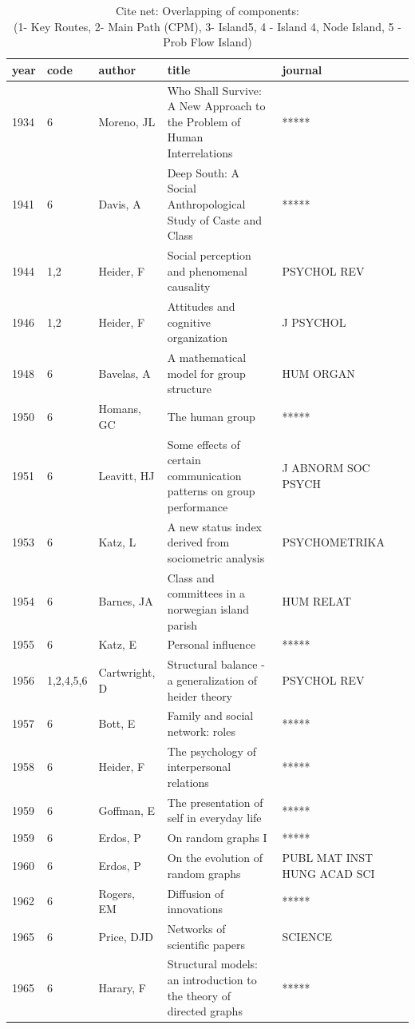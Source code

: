 \documentclass[11pt]{article} %
\begin{document}
\begin{longtable}{p{0.8cm}|p{1.25cm}|p{2.8cm}|p{7.5cm}|p{3cm}l}
\caption{Cite net: \label{compareA} Overlapping of components: \\
(1- Key Routes, 2- Main Path (CPM), 3- Island5, 4 - Island 4, Node Island, 5 - Prob Flow Island)} \\
\small
\renewcommand{\arraystretch}{0.7}
year&	code&	author&	title&	journal\\ \hline \endhead
1934&	6&	Moreno, JL&	 Who Shall Survive: A New Approach to the Problem of Human Interrelations&*****\\
1941&	6&	Davis, A &	 Deep South: A Social Anthropological Study of Caste and Class&*****\\
1944&	1,2&	Heider, F&	 Social perception and phenomenal causality&	PSYCHOL REV\\
1946&	1,2&	Heider, F&	 Attitudes and cognitive organization&	J PSYCHOL\\
1948&	6&	Bavelas, A&	 A mathematical model for group structure&	HUM ORGAN\\
1950&	6&	Homans, GC&	 The human group&	*****\\
1951&	6&	Leavitt, HJ&	 Some effects of certain communication patterns on group performance&	J ABNORM SOC PSYCH\\
1953&	6&	Katz, L&	 A new status index derived from sociometric analysis&	PSYCHOMETRIKA\\
1954&	6&	Barnes, JA&	 Class and committees in a norwegian island parish&	HUM RELAT\\
1955&	6&	Katz, E&	 Personal influence&	*****\\
1956&	1,2,4,5,6&	Cartwright, D&	 Structural balance - a generalization of heider theory&	PSYCHOL REV\\
1957&	6&	Bott, E&	 Family and social network: roles&	*****\\
1958&	6&	Heider, F&	 The psychology of interpersonal relations&	*****\\
1959&	6&	Goffman, E&	 The presentation of self in everyday life&	*****\\
1959&	6&	Erdos, P&	 On random graphs I&	*****\\
1960&	6&	Erdos, P&	On the evolution of random graphs&	PUBL MAT INST HUNG ACAD SCI\\
1962&	6&	Rogers, EM&	 Diffusion of innovations&	*****\\
1965&	6&	Price, DJD&	 Networks of scientific papers&	SCIENCE\\
1965&	6&	Harary, F&	 Structural models: an introduction to the theory of directed graphs&	*****\\

\end{longtable}
\end{document}
